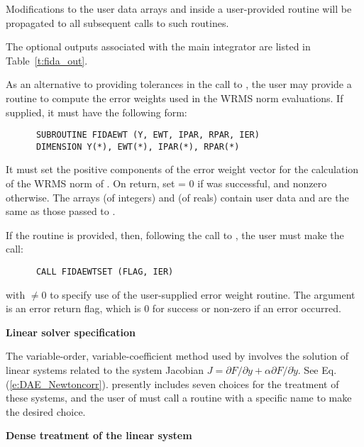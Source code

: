 \begin{Steps}
{    Modifications to the user data arrays  and  inside a 
    user-provided routine will be propagated to all subsequent calls to
    such routines.

    The optional outputs associated with the main {\ida} integrator
    are listed in Table~\ref{t:fida_out}.
  }

  As an alternative to providing tolerances in the call to , the
  user may provide a routine to compute the error weights used in the WRMS norm
  evaluations. If supplied, it must have the following form:
\begin{verbatim}
      SUBROUTINE FIDAEWT (Y, EWT, IPAR, RPAR, IER)
      DIMENSION Y(*), EWT(*), IPAR(*), RPAR(*)
\end{verbatim}
  It must set the positive components of the error weight vector  for
  the calculation of the WRMS norm of . On return, set
   = 0 if  was successful, and nonzero otherwise.
  The arrays  (of integers) and  (of reals) contain user data
  and are the same as those passed to .

  If the  routine is provided, then, 
  following the call to , the user must make the call:
\begin{verbatim}
      CALL FIDAEWTSET (FLAG, IER)
\end{verbatim}
  with  $\neq 0$ to specify use of the user-supplied error weight routine.
  The argument  is an error return flag, which is $0$ 
  for success or non-zero if an error occurred.

\item\label{i:fida_lin_solv_spec} {\bf Linear solver specification} 
  
  The variable-order, variable-coefficient  method used by {\ida} involves
  the solution of linear systems related to the system Jacobian
  $J = \partial F / \partial y + \alpha \partial F / \partial \dot{y}$.
  See Eq. (\ref{e:DAE_Newtoncorr}).  {\ida} presently includes seven choices for
  the treatment of these systems, and the user of {\fida} must call a routine with
  a specific name to make the desired choice.


  {\s} {\bf Dense treatment of the linear system}
  

\end{Steps}
